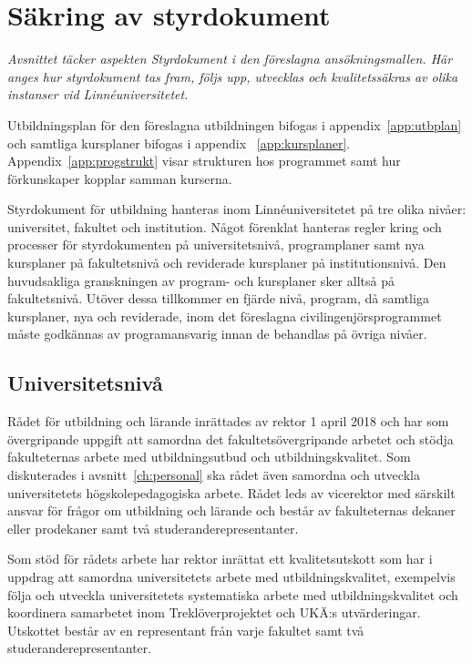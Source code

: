 \chapter{Säkring av styrdokument\label{ch:styrdokument}}

\begin{tcbdoublebox}
\emph{Avsnittet täcker aspekten Styrdokument i den föreslagna ansökningsmallen. Här anges hur styrdokument tas fram, följs upp, utvecklas och kvalitetssäkras av olika instanser vid Linnéuniversitetet.}
\end{tcbdoublebox}

Utbildningsplan för den föreslagna utbildningen bifogas i appendix~\ref{app:utbplan} och samtliga kursplaner bifogas i appendix ~\ref{app:kursplaner}. Appendix~\ref{app:progstrukt} visar strukturen hos programmet samt hur förkunskaper kopplar samman kurserna.
 
Styrdokument för utbildning hanteras inom Linnéuniversitetet på tre olika nivåer: universitet, fakultet och institution. Något förenklat hanteras regler kring och processer för styrdokumenten på universitetsnivå, programplaner samt nya kursplaner på fakultetsnivå och reviderade kursplaner på institutionsnivå. Den huvudsakliga granskningen av program- och kursplaner sker alltså på fakultetsnivå. Utöver dessa tillkommer en fjärde nivå, program, då samtliga kursplaner, nya och reviderade, inom det föreslagna civilingenjörsprogrammet måste godkännas av programansvarig innan de behandlas på övriga nivåer.

\section{Universitetsnivå}

Rådet för utbildning och lärande inrättades av rektor 1 april 2018 och har som övergripande uppgift att samordna det fakultetsövergripande arbetet och stödja fakulteternas arbete med utbildningsutbud och utbildningskvalitet. Som diskuterades i avsnitt~\ref{ch:personal} ska rådet även samordna och utveckla universitetets högskolepedagogiska arbete. Rådet leds av vicerektor med särskilt ansvar för frågor om utbildning och lärande och består av fakulteternas dekaner eller prodekaner samt två studeranderepresentanter.

Som stöd för rådets arbete har rektor inrättat ett kvalitetsutskott som har i uppdrag att samordna universitetets arbete med utbildningskvalitet, exempelvis följa och utveckla universitetets systematiska arbete med utbildningskvalitet och koordinera samarbetet inom Treklöverprojektet och UKÄ:s utvärderingar. Utskottet består av en representant från varje fakultet samt två studeranderepresentanter.

